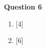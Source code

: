 \noindent
\textbf{Question 6}
\begin{enumerate}[label=(\roman*)]

    \item  \hfill [4]

    \item  \hfill [6]

\end{enumerate}


